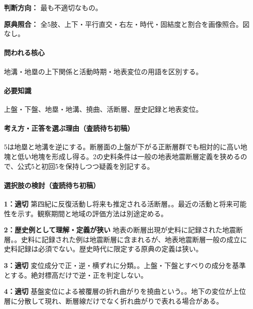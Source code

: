 \noindent\textbf{判断方向：} 最も不適切なもの。\par

\noindent\textbf{原典照合：} 全5肢、上下・平行直交・右左・時代・固結度と割合を画像照合。図なし。\par

\paragraph{問われる核心} 地溝・地塁の上下関係と活動時期・地表変位の用語を区別する。

\paragraph{必要知識} 上盤・下盤、地塁・地溝、撓曲、活断層、歴史記録と地表変位。

\paragraph{考え方・正答を選ぶ理由（査読待ち初稿）} 5は地塁と地溝を逆にする。断層面の上盤が下がる正断層群でも相対的に高い地塊と低い地塊を形成し得る。2の史料条件は一般の地表地震断層定義を狭めるので、公式5と初回5を保持しつつ疑義を別記する。

\paragraph{選択肢の検討（査読待ち初稿）}\mbox{}\par

\noindent\textbf{1：適切} 第四紀に反復活動し将来も推定される活断層。。最近の活動と将来可能性を示す。観察期間と地域の評価方法は別途定める。\par

\noindent\textbf{2：歴史例として理解・定義が狭い} 地表の断層出現が史料に記録された地震断層。。史料に記録された例は地震断層に含まれるが、地表地震断層一般の成立に史料記録は必須でない。歴史時代に限定する原典の定義は狭い。\par

\noindent\textbf{3：適切} 変位成分で正・逆・横ずれに分類。。上盤・下盤とすべりの成分を基準とする。絶対標高だけで逆・正を判定しない。\par

\noindent\textbf{4：適切} 基盤変位による被覆層の折れ曲がりを撓曲という。。地下の変位が上位層に分散して現れ、断層線だけでなく折れ曲がりで表れる場合がある。\par

